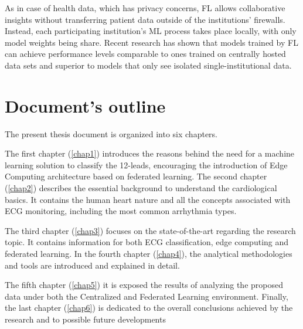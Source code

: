 As in case of health data, which has privacy concerns, FL allows collaborative insights without transferring patient data outside of the institutions’ firewalls. Instead, each participating institution’s ML process takes place locally, with only model weights being share. Recent research has shown that models trained by FL can achieve performance levels comparable to ones trained on centrally hosted data sets and superior to models that only see isolated single-institutional data. \cite{Rieke_2020}





\section{Document's outline} \label{doc_struct}

The present thesis document is organized into six chapters. 

The first chapter (\ref{chap1}) introduces the reasons behind the need for a machine learning solution to classify the 12-leads, encouraging the introduction of Edge Computing architecture based on federated learning. The second chapter (\ref{chap2}) describes the essential background to understand the cardiological basics. It contains the human heart nature and all the concepts associated with ECG monitoring, including the most common arrhythmia types.

The third chapter (\ref{chap3}) focuses on the state-of-the-art regarding the research topic. It contains information for both ECG classification, edge computing and federated learning. In the fourth chapter (\ref{chap4}), the analytical methodologies and tools are introduced and explained in detail. 

The fifth chapter (\ref{chap5}) it is exposed the results of analyzing the proposed data under both the Centralized and Federated Learning environment. Finally, the last chapter (\ref{chap6}) is dedicated to the overall conclusions achieved by the research and to possible future developments